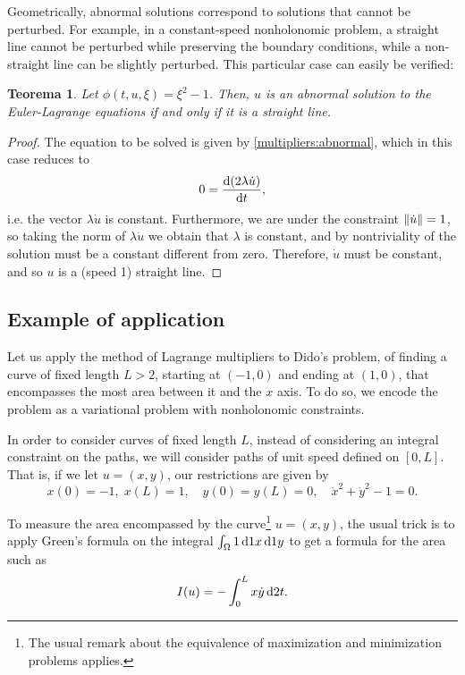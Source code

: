 \documentclass{article}
\theoremstyle{plain}
\newtheorem{theorem}{Teorema}
\theoremstyle{plain}
\theoremstyle{nonumberplain}
\newtheorem{proof}{Dem}
\theoremstyle{empty}
\DeclarePairedDelimiter\norm{\lVert}{\rVert}
\begin{document}
Geometrically, abnormal solutions correspond to solutions that cannot be perturbed. For example, in a constant-speed nonholonomic problem, a straight line cannot be perturbed while preserving the boundary conditions, while a non-straight line can be slightly perturbed. This particular case can easily be verified:

\begin{theorem}\label{abnormalline}
Let $\phi(t,u,\xi) = \xi^2 - 1$. Then, $u$ is an abnormal solution to the Euler-Lagrange equations if and only if it is a straight line.
\end{theorem}

\begin{proof}
The equation to be solved is given by \eqref{multipliers:abnormal}, which in this case reduces to
\[0 = \diff{(2 \lambda \dot u)}t,\]
i.e. the vector $\lambda \dot u$ is constant. Furthermore, we are under the constraint $\norm{\dot u} = 1$, so taking the norm of $\lambda \dot u$ we obtain that $\lambda$ is constant, and by nontriviality of the solution must be a constant different from zero. Therefore, $\dot u$ must be constant, and so $u$ is a (speed 1) straight line.
\end{proof}

\subsection{Example of application}

Let us apply the method of Lagrange multipliers to Dido's problem, of finding a curve of fixed length $L > 2$, starting at $(-1,0)$ and ending at $(1,0)$, that encompasses the most area between it and the $x$ axis. To do so, we encode the problem as a variational problem with nonholonomic constraints.

In order to consider curves of fixed length $L$, instead of considering an integral constraint on the paths, we will consider paths of unit speed defined on $[0,L]$. That is, if we let $u = (x,y)$, our restrictions are given by
\begin{equation}\label{initcond}
x(0) = -1,\; x(L) = 1, \quad y(0) = y(L) = 0, \quad \dot x^2 + \dot y^2 - 1 = 0.
\end{equation}

To measure the area encompassed by the curve\footnote{The usual remark about the equivalence of maximization and minimization problems applies.} $u = (x,y)$, the usual trick is to apply Green's formula on the integral $\int_\Omega 1 \dl1 x \dl1 y$ to get a formula for the area such as
\[I(u) = - \int_0^L x \dot y \dl2 t.\]
\end{document}
